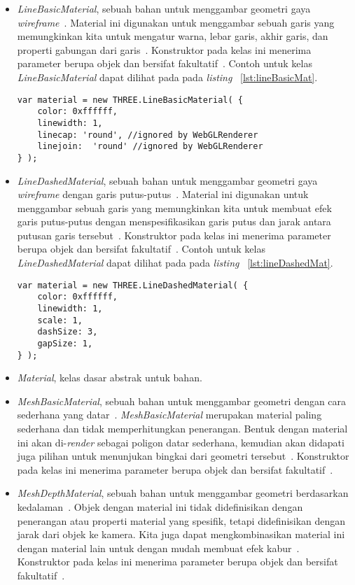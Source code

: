 \begin{itemize}
	\begin{itemize}
		\item {\it LineBasicMaterial}, sebuah bahan untuk menggambar geometri gaya {\it wireframe}~\cite{threejs}. Material ini digunakan untuk menggambar sebuah garis yang memungkinkan kita untuk mengatur warna, lebar garis, akhir garis, dan properti gabungan dari garis~\cite{learningThreejs}. Konstruktor pada kelas ini menerima parameter berupa objek dan bersifat fakultatif~\cite{threejs}. Contoh untuk kelas {\it LineBasicMaterial} dapat dilihat pada pada {\it listing} ~\ref{lst:lineBasicMat}.
\begin{lstlisting}[caption={Contoh penggunaan kelas {\it LineBasicMaterial}.}, label={lst:lineBasicMat},captionpos=b]
var material = new THREE.LineBasicMaterial( {
	color: 0xffffff,
	linewidth: 1,
	linecap: 'round', //ignored by WebGLRenderer
	linejoin:  'round' //ignored by WebGLRenderer
} );
\end{lstlisting}
		\item {\it LineDashedMaterial}, sebuah bahan untuk menggambar geometri gaya {\it wireframe} dengan garis putus-putus~\cite{threejs}. Material ini digunakan untuk menggambar sebuah garis yang memungkinkan kita untuk membuat efek garis putus-putus dengan menspesifikasikan garis putus dan jarak antara putusan garis tersebut~\cite{learningThreejs}. Konstruktor pada kelas ini menerima parameter berupa objek dan bersifat fakultatif~\cite{threejs}. Contoh untuk kelas {\it LineDashedMaterial} dapat dilihat pada pada {\it listing} ~\ref{lst:lineDashedMat}.
\begin{lstlisting}[caption={Contoh penggunaan kelas {\it LineDashMaterial}.}, label={lst:lineDashedMat},captionpos=b]
var material = new THREE.LineDashedMaterial( {
	color: 0xffffff,
	linewidth: 1,
	scale: 1,
	dashSize: 3,
	gapSize: 1,
} );
\end{lstlisting}
		\item {\it Material}, kelas dasar abstrak untuk bahan.
		\item {\it MeshBasicMaterial}, sebuah bahan untuk menggambar geometri dengan cara sederhana yang datar~\cite{threejs}. {\it MeshBasicMaterial} merupakan material paling sederhana dan tidak memperhitungkan penerangan. Bentuk dengan material ini akan di-{\it render} sebagai poligon datar sederhana, kemudian akan didapati juga pilihan untuk menunjukan bingkai dari geometri tersebut~\cite{learningThreejs}. Konstruktor pada kelas ini menerima parameter berupa objek dan bersifat fakultatif~\cite{threejs}.
		\item {\it MeshDepthMaterial}, sebuah bahan untuk menggambar geometri berdasarkan kedalaman~\cite{threejs}. Objek dengan material ini tidak didefinisikan dengan penerangan atau properti material yang spesifik, tetapi didefinisikan dengan jarak dari objek ke kamera. Kita juga dapat mengkombinasikan material ini dengan material lain untuk dengan mudah membuat efek kabur~\cite{learningThreejs}. Konstruktor pada kelas ini menerima parameter berupa objek dan bersifat fakultatif~\cite{threejs}.

\end{itemize}
\end{itemize}
